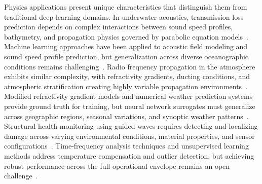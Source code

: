 Physics applications present unique characteristics that distinguish them from traditional deep learning domains. In underwater acoustics, transmission loss prediction depends on complex interactions between sound speed profiles, bathymetry, and propagation physics governed by parabolic equation models~\cite{Lalita2024Underwat,Tu2023A,Wang2024Ocean,Agustinus2024ANALYSIS,Kayser2023Validity}. Machine learning approaches have been applied to acoustic field modeling and sound speed profile prediction, but generalization across diverse oceanographic conditions remains challenging~\cite{Sun2025Endtoend,Mccarthy2023ReducedO,Huang2021Rapid,Ahmed2021Machine}. Radio frequency propagation in the atmosphere exhibits similar complexity, with refractivity gradients, ducting conditions, and atmospheric stratification creating highly variable propagation environments~\cite{Bidigare2025DualPola,McQuaid2025Overview,Pastore2025Identify,Bidigare2023Data}. Modified refractivity gradient models and numerical weather prediction systems provide ground truth for training, but neural network surrogates must generalize across geographic regions, seasonal variations, and synoptic weather patterns~\cite{Kalu2018Determin,Saleem2016Statisti,Parada2023A,Javeed2018A,Pu2022Modified,Emmanuel2020Geostati,Rabinovich2025Using,Nguyen2023Machine}. Structural health monitoring using guided waves requires detecting and localizing damage across varying environmental conditions, material properties, and sensor configurations~\cite{Zheng2023A,Cao2019Probabil,Yang2024Modeling,Liu2022An,Chen2021Fatigue,Paialunga2023Damage}. Time-frequency analysis techniques and unsupervised learning methods address temperature compensation and outlier detection, but achieving robust performance across the full operational envelope remains an open challenge~\cite{Yang2022Guidelin,Yang2021Longterm,Tabjula2021Outlier,Yue2020A,Zhou2025A,Singh2025Hybrid,Han2025Timefreq,Zhang2025TimeFreq,Tansel2022NEW,Liu2020A,Huang2021A}.

